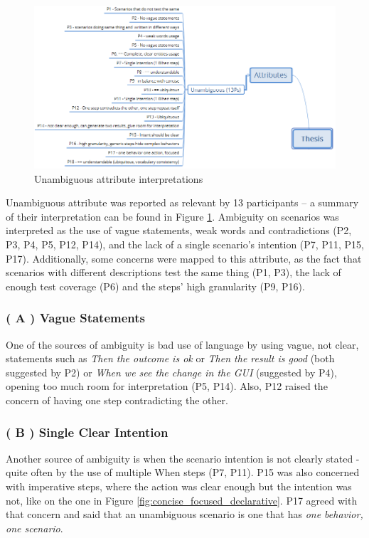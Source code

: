 \begin{figure}[t]
	\centering
	\includegraphics[scale=0.8]{images/unambiguous_attribute}
	\caption[\hspace{2mm}Unambiguous attribute interpretations]{Unambiguous attribute interpretations}
	\label{fig:unambiguous_attribute}
\end{figure}

Unambiguous attribute was reported as relevant by 13 participants -- a summary of their interpretation can be found in Figure \ref{fig:unambiguous_attribute}. Ambiguity on scenarios was interpreted as the use of vague statements, weak words and contradictions (P2, P3, P4, P5, P12, P14), and the lack of a single scenario's intention (P7, P11, P15, P17). Additionally, some concerns were mapped to this attribute, as the fact that scenarios with different descriptions test the same thing (P1, P3), the lack of enough test coverage (P6) and the steps' high granularity (P9, P16).

\subsubsection{\textbf{( A ) Vague Statements}}
One of the sources of ambiguity is bad use of language by using vague, not clear, statements such as \textit{Then the outcome is ok} or \textit{Then the result is good} (both suggested by P2) or \textit{When we see the change in the GUI} (suggested by P4), opening too much room for interpretation (P5, P14). Also, P12 raised the concern of having one step contradicting the other.

\subsubsection{\textbf{( B ) Single Clear Intention}}
Another source of ambiguity is when the scenario intention is not clearly stated - quite often by the use of multiple When steps (P7, P11). P15 was also concerned with imperative steps, where the action was clear enough but the intention was not, like on the one in Figure \ref{fig:concise_focused_declarative}. P17 agreed with that concern and said that an unambiguous scenario is one that has \textit{one behavior, one scenario}.

